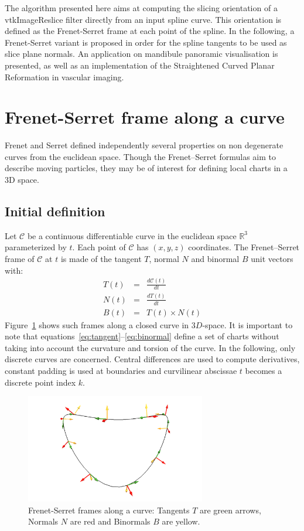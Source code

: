 \documentclass{InsightArticle}
\begin{document}
The algorithm presented here aims at computing the slicing orientation of a
vtkImageReslice filter directly from an input spline curve. This orientation
is defined as the Frenet-Serret frame at each point of the spline. In the 
following, a Frenet-Serret variant is proposed in order for the spline tangents
to be used as slice plane normals. An application on mandibule panoramic 
visualisation is presented, as well as an implementation of the Straightened
Curved Planar Reformation in vascular imaging.
%
\section{Frenet-Serret frame along a curve}
Frenet \cite{FRE52} and Serret \cite{SER51} defined independently several
properties on non degenerate curves from the euclidean space. Though the 
Frenet--Serret formulas aim to describe moving particles, they may be of
interest for defining local charts in a 3D space. 
%
\subsection{Initial definition}
%
Let $\mathcal{C}$ be a continuous differentiable curve in the euclidean space
$\mathbb{R}^3$ parameterized by $t$. Each point of $\mathcal{C}$ has $(x,y,z)$
coordinates. The Frenet--Serret frame of $\mathcal{C}$ at $t$ is made of the 
tangent $T$, normal $N$ and binormal $B$ unit vectors with:
\begin{eqnarray}
T(t) &=& \frac{d\mathcal{C}(t)}{dt}\label{eq:tangent}\\
N(t) &=& \frac{dT(t)}{dt}\label{eq:normal}\\
B(t) &=& T(t)\times N(t)\label{eq:binormal}
\end{eqnarray}
%
Figure~\ref{fig:frenet-serret_frames} shows such frames along a closed curve
in $3D$-space. It is important to note that equations~\eqref{eq:tangent}--\eqref{eq:binormal}
define a set of charts without taking into account the curvature and torsion of
the curve. In the following, only discrete curves are concerned. Central
differences are used to compute derivatives, constant padding is used at
boundaries and curvilinear abscissae $t$ becomes a discrete point index $k$.
%
\begin{figure}
\centering
\includegraphics[width=0.7\textwidth]{Images/frenet-serret_frames}
\caption{Frenet-Serret frames along a curve: Tangents $T$ are green arrows,
Normals $N$ are red and Binormals $B$ are yellow.}
\label{fig:frenet-serret_frames}
\end{figure}
%
\end{document}
